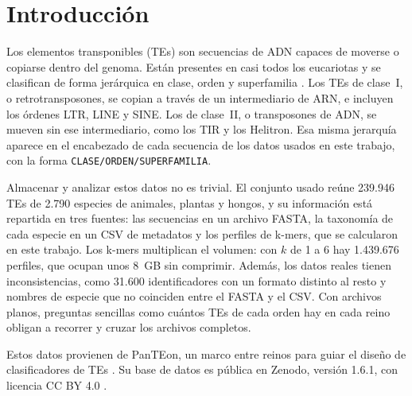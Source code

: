 \documentclass[unnumsec,namedate,webpdf,contemporary,large]{oup-authoring-template}
\begin{document}
\maketitle

\section{Introducci\'on}

Los elementos transponibles (TEs) son secuencias de ADN capaces de moverse o copiarse dentro del genoma. Est\'an presentes en casi todos los eucariotas y se clasifican de forma jer\'arquica en clase, orden y superfamilia \citep{wicker2007unified}. Los TEs de clase~I, o retrotransposones, se copian a trav\'es de un intermediario de ARN, e incluyen los \'ordenes LTR, LINE y SINE. Los de clase~II, o transposones de ADN, se mueven sin ese intermediario, como los TIR y los Helitron. Esa misma jerarqu\'ia aparece en el encabezado de cada secuencia de los datos usados en este trabajo, con la forma \texttt{CLASE/ORDEN/SUPERFAMILIA}.

Almacenar y analizar estos datos no es trivial. El conjunto usado re\'une 239.946 TEs de 2.790 especies de animales, plantas y hongos, y su informaci\'on est\'a repartida en tres fuentes: las secuencias en un archivo FASTA, la taxonom\'ia de cada especie en un CSV de metadatos y los perfiles de k-mers, que se calcularon en este trabajo. Los k-mers multiplican el volumen: con $k$ de 1 a 6 hay 1.439.676 perfiles, que ocupan unos 8~GB sin comprimir. Adem\'as, los datos reales tienen inconsistencias, como 31.600 identificadores con un formato distinto al resto y nombres de especie que no coinciden entre el FASTA y el CSV. Con archivos planos, preguntas sencillas como cu\'antos TEs de cada orden hay en cada reino obligan a recorrer y cruzar los archivos completos.

Estos datos provienen de PanTEon, un marco entre reinos para guiar el dise\~no de clasificadores de TEs \citep{orozcoarias2026panteon}. Su base de datos es p\'ublica en Zenodo, versi\'on 1.6.1, con licencia CC BY 4.0 \citep{panteon2026database}.
\end{document}
